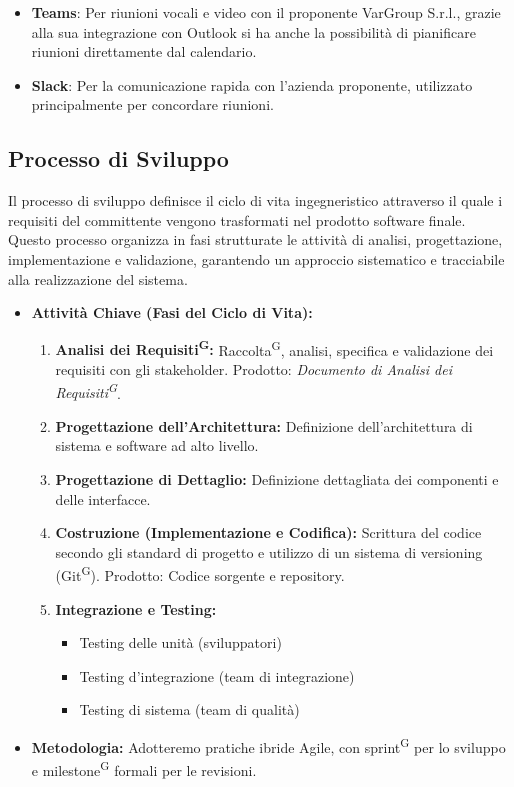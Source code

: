 \documentclass[a4paper, 11pt]{article}
\begin{document}
\begin{itemize}
  \item \textbf{Teams}: Per riunioni vocali e video con il proponente VarGroup S.r.l., grazie alla sua integrazione con Outlook si ha anche la possibilità di pianificare riunioni direttamente dal calendario.
  \item \textbf{Slack}: Per la comunicazione rapida con l'azienda proponente, utilizzato principalmente per concordare riunioni.
\end{itemize}



\subsection{Processo di Sviluppo}
Il processo di sviluppo definisce il ciclo di vita ingegneristico attraverso il quale i requisiti del committente vengono trasformati nel prodotto software finale. 
Questo processo organizza in fasi strutturate le attività di analisi, progettazione, implementazione e validazione, garantendo un approccio sistematico e tracciabile alla realizzazione del sistema.\\

\begin{itemize}
    \item \textbf{Attività Chiave (Fasi del Ciclo di Vita):}
    \begin{enumerate}
        \item \textbf{Analisi dei Requisiti\textsuperscript{G}:} Raccolta\textsuperscript{G}, analisi, specifica e validazione dei requisiti con gli stakeholder. Prodotto: \textit{Documento di Analisi dei Requisiti\textsuperscript{G}}.
        \item \textbf{Progettazione dell'Architettura:} Definizione dell'architettura di sistema e software ad alto livello.
        \item \textbf{Progettazione di Dettaglio:} Definizione dettagliata dei componenti e delle interfacce.
        \item \textbf{Costruzione (Implementazione e Codifica):} Scrittura del codice secondo gli standard di progetto e utilizzo di un sistema di versioning (Git\textsuperscript{G}). Prodotto: Codice sorgente e repository.
        \item \textbf{Integrazione e Testing:}
        \begin{itemize}
            \item Testing delle unità (sviluppatori)
            \item Testing d'integrazione (team di integrazione)
            \item Testing di sistema (team di qualità)
        \end{itemize}
    \end{enumerate}
    \item \textbf{Metodologia:} Adotteremo pratiche ibride Agile, con sprint\textsuperscript{G} per lo sviluppo e milestone\textsuperscript{G} formali per le revisioni.
\end{itemize}
\end{document}
